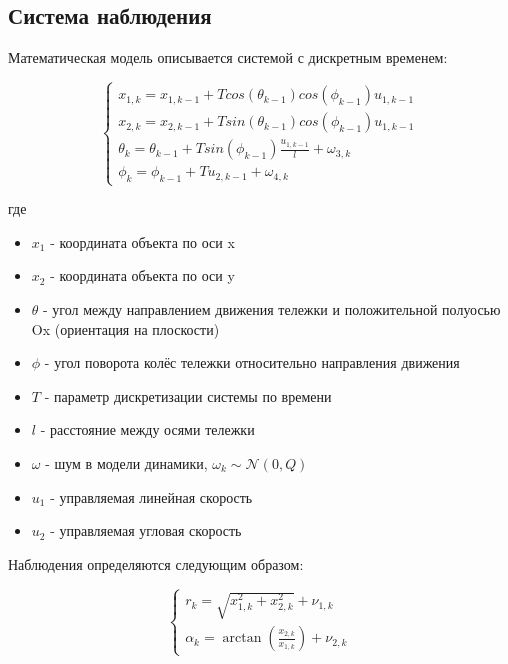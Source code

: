 \documentclass[12pt]{article}
\begin{document}
\subsection{Система наблюдения}

Математическая модель описывается системой с дискретным временем:

\begin{equation*}
	\begin{cases}
		x_{1, k} = x_{1, k-1} + T cos(\theta_{k-1}) cos(\phi_{k-1}) u_{1, k-1}           \\
		x_{2, k} = x_{2, k-1} + T sin(\theta_{k-1}) cos(\phi_{k-1}) u_{1, k-1}           \\
		\theta_k = \theta_{k-1} + T sin(\phi_{k-1}) \frac{u_{1, k-1}}{l} + \omega_{3, k} \\
		\phi_k = \phi_{k-1} + T u_{2, k-1} + \omega_{4, k}
	\end{cases}
\end{equation*}

где

\begin{itemize}
	\item $x_1$ - координата объекта по оси x
	\item $x_2$ - координата объекта по оси y
	\item $\theta$ - угол между направлением движения тележки и положительной полуосью Ox (ориентация на плоскости)
	\item $\phi$ - угол поворота колёс тележки относительно направления движения
	\item $T$ - параметр дискретизации системы по времени
	\item $l$ - расстояние между осями тележки
	\item $\omega$ - шум в модели динамики, $\omega_k \sim \mathcal{N}(0, Q)$
	\item $u_1$ - управляемая линейная скорость
	\item $u_2$ - управляемая угловая скорость
\end{itemize}

Наблюдения определяются следующим образом:

\begin{equation*}
	\begin{cases}
		r_k = \sqrt{x_{1, k}^2 + x_{2, k}^2} + \nu_{1, k} \\
		\alpha_k = \arctan(\frac{x_{2, k}}{x_{1, k}}) + \nu_{2, k}
	\end{cases}
\end{equation*}
\end{document}
